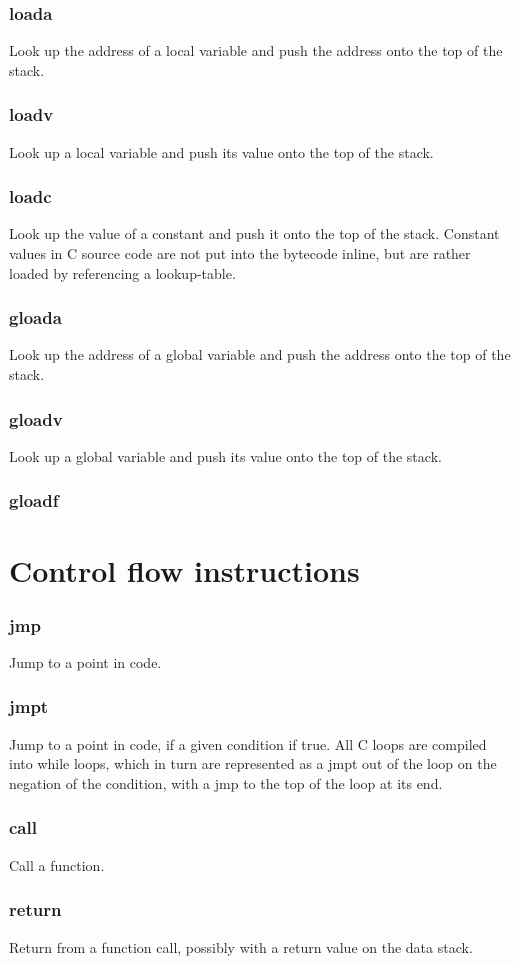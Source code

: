 \subsubsection{loada}
Look up the address of a local variable and push the address onto the top of the stack.
\subsubsection{loadv}
Look up a local variable and push its value onto the top of the stack.
\subsubsection{loadc}
Look up the value of a constant and push it onto the top of the stack. Constant values in C source code are not put into the bytecode inline, but are rather loaded by referencing a lookup-table.
\subsubsection{gloada}
Look up the address of a global variable and push the address onto the top of the stack.
\subsubsection{gloadv}
Look up a global variable and push its value onto the top of the stack.
\subsubsection{gloadf}

\section{Control flow instructions}
\subsubsection{jmp}
Jump to a point in code.
\subsubsection{jmpt}
Jump to a point in code, if a given condition if true. All C loops are compiled into while loops, which in turn are represented as a jmpt out of the loop on the negation of the condition, with a jmp to the top of the loop at its end.
\subsubsection{call}
Call a function.
\subsubsection{return}
Return from a function call, possibly with a return value on the data stack.